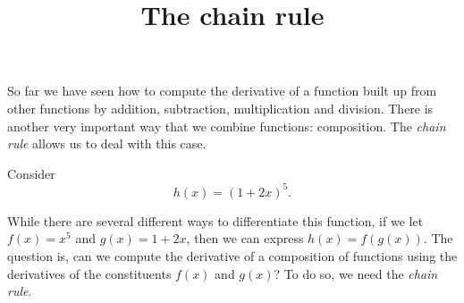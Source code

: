 \documentclass{ximera}
\title[Dig-In:]{The chain rule}
\begin{document}
\begin{abstract}
\end{abstract}
\maketitle


So far we have seen how to compute the derivative of a function built
up from other functions by addition, subtraction, multiplication and
division. There is another very important way that we combine
functions: composition. The \textit{chain rule} allows us to deal with
this case.


Consider
\[
h(x) = (1+2x)^5.
\] 

While there are several different ways to differentiate this function,
if we let $f(x) = x^5$ and $g(x) = 1+2x$, then we can express $h(x) =
f(g(x))$. The question is, can we compute the derivative of a
composition of functions using the derivatives of the constituents
$f(x)$ and $g(x)$? To do so, we need the \textit{chain rule}.
\end{document}
